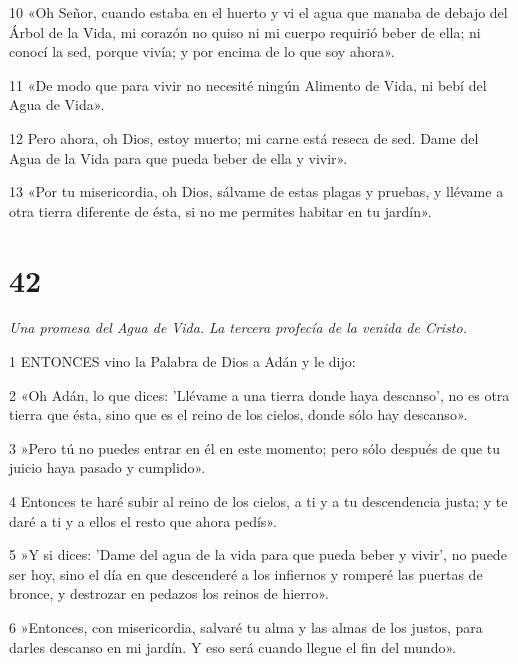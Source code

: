 \par 10 «Oh Señor, cuando estaba en el huerto y vi el agua que manaba de debajo del Árbol de la Vida, mi corazón no quiso ni mi cuerpo requirió beber de ella; ni conocí la sed, porque vivía; y por encima de lo que soy ahora».

\par 11 «De modo que para vivir no necesité ningún Alimento de Vida, ni bebí del Agua de Vida».

\par 12 Pero ahora, oh Dios, estoy muerto; mi carne está reseca de sed. Dame del Agua de la Vida para que pueda beber de ella y vivir».

\par 13 «Por tu misericordia, oh Dios, sálvame de estas plagas y pruebas, y llévame a otra tierra diferente de ésta, si no me permites habitar en tu jardín».

\chapter{42}

\par \textit{Una promesa del Agua de Vida. La tercera profecía de la venida de Cristo.}

\par 1 ENTONCES vino la Palabra de Dios a Adán y le dijo:

\par 2 «Oh Adán, lo que dices: 'Llévame a una tierra donde haya descanso', no es otra tierra que ésta, sino que es el reino de los cielos, donde sólo hay descanso».

\par 3 »Pero tú no puedes entrar en él en este momento; pero sólo después de que tu juicio haya pasado y cumplido».

\par 4 Entonces te haré subir al reino de los cielos, a ti y a tu descendencia justa; y te daré a ti y a ellos el resto que ahora pedís».

\par 5 »Y si dices: 'Dame del agua de la vida para que pueda beber y vivir', no puede ser hoy, sino el día en que descenderé a los infiernos y romperé las puertas de bronce, y destrozar en pedazos los reinos de hierro».

\par 6 »Entonces, con misericordia, salvaré tu alma y las almas de los justos, para darles descanso en mi jardín. Y eso será cuando llegue el fin del mundo».

